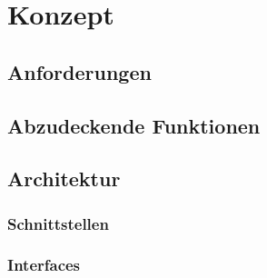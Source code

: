 \chapter{Konzept}
\section{Anforderungen}
\section{Abzudeckende Funktionen}
\section{Architektur}
\subsection{Schnittstellen}
\subsection{Interfaces}
